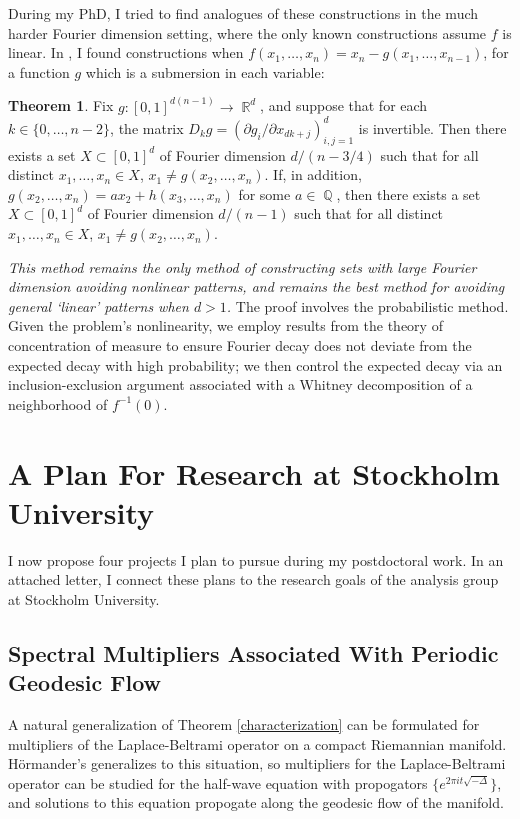 \documentclass[11pt]{article}
\theoremstyle{definition}
\newtheorem{theorem}{Theorem}
\DeclareMathOperator{\QQ}{\mathbb{Q}}
\DeclareMathOperator{\RR}{\mathbb{R}}
\begin{document}
During my PhD, I tried to find analogues of these constructions in the much harder Fourier dimension setting, where the only known constructions assume $f$ is linear. In \cite{DensonFourier}, I found constructions when $f(x_1,\dots,x_n) = x_n - g(x_1,\dots,x_{n-1})$, for a function $g$ which is a submersion in each variable:

\begin{theorem}
    Fix $g: [0,1]^{d(n-1)} \to \RR^d$, and suppose that for each $k \in \{ 0, \dots, n-2 \}$, the matrix $D_k g = ( \partial g_i / \partial x_{dk+j} )_{i,j = 1}^d$ is invertible. Then there exists a set $X \subset [0,1]^d$ of Fourier dimension $d/(n-3/4)$ such that for all distinct $x_1,\dots,x_n \in X$, $x_1 \neq g(x_2,\dots,x_n)$. If, in addition, $g(x_2,\dots,x_n) = ax_2 + h(x_3,\dots,x_n)$ for some $a \in \QQ$, then there exists a set $X \subset [0,1]^d$ of Fourier dimension $d/(n-1)$ such that for all distinct $x_1,\dots,x_n \in X$, $x_1 \neq g(x_2,\dots,x_n)$.
\end{theorem}

\emph{This method remains the only method of constructing sets with large Fourier dimension avoiding nonlinear patterns, and remains the best method for avoiding general `linear' patterns when $d > 1$.} The proof involves the probabilistic method. Given the problem's nonlinearity, we employ results from the theory of concentration of measure to ensure Fourier decay does not deviate from the expected decay with high probability; we then control the expected decay via an inclusion-exclusion argument associated with a Whitney decomposition of a neighborhood of $f^{-1}(0)$.

\section*{A Plan For Research at Stockholm University}

I now propose four projects I plan to pursue during my postdoctoral work. In an attached letter, I connect these plans to the research goals of the analysis group at Stockholm University.

\subsection*{Spectral Multipliers Associated With Periodic Geodesic Flow}

A natural generalization of Theorem \ref{characterization} can be formulated for multipliers of the Laplace-Beltrami operator on a compact Riemannian manifold. H\"{o}rmander's generalizes to this situation, so multipliers for the Laplace-Beltrami operator can be studied for the half-wave equation with propogators $\{ e^{2 \pi i t \sqrt{-\Delta}} \}$, and solutions to this equation propogate along the geodesic flow of the manifold.
\end{document}
